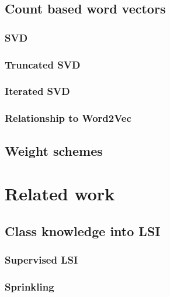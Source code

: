     \section{Count based word vectors}
        \cite{wiemer2004latent} %
        \subsection{SVD}
        {}
        \subsection{Truncated SVD}
        \subsection{Iterated SVD}
            \cite{brand2006fast} %
        \subsection{Relationship to Word2Vec}
            \cite{naili2017comparative} %
            \cite{levy2014neural} %
            \cite{altszyler2016comparative} %
            \cite{levy2015improving} %


    \section{Weight schemes}
        \cite{wu2017balancing} %


\chapter{Related work}
    \section{Class knowledge into LSI}
        \subsection{Supervised LSI}
            \cite{sun2004supervised} %

        \subsection{Sprinkling}
            \cite{chakraborti2007supervised} %
        
